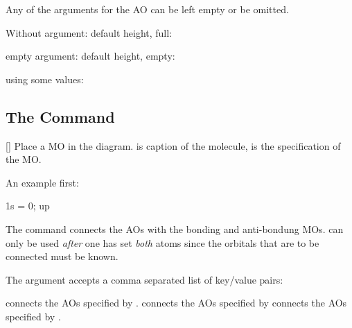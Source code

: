 \documentclass[load-preamble+]{cnltx-doc}
\begin{document}
Any of the arguments for the \ac{AO} can be left empty or be omitted.
\begin{example}
  Without argument: default height, full:\par
  \begin{modiagram}
  \end{modiagram}
\end{example}

\begin{example}
  empty argument: default height, empty:\par
  \begin{modiagram}
  \end{modiagram}
\end{example}

\begin{example}
  using some values:\par
  \begin{modiagram}
  \end{modiagram}
\end{example}

\subsection{The  Command}\label{ssec:molecule}
\begin{commands}
  []
    Place a \acs{MO} in the diagram.  is caption of the molecule,
     is the specification of the \ac{MO}.
\end{commands}

An example first:
\begin{example}
  \begin{modiagram}
     { 1s = {  0; up } }
  \end{modiagram}
\end{example}
The command  connects the \acp{AO} with the bonding and
anti-bondung \acp{MO}.   can only be used \emph{after} one has
set \emph{both} atoms since the orbitals that are to be connected must be
known.

The argument  accepts a comma separated list of key/value pairs:
\begin{options}
    connects the \acp{AO} specified by .
    connects the \acp{AO} specified by 
    connects the \acp{AO} specified by .
\end{options}
\end{document}
